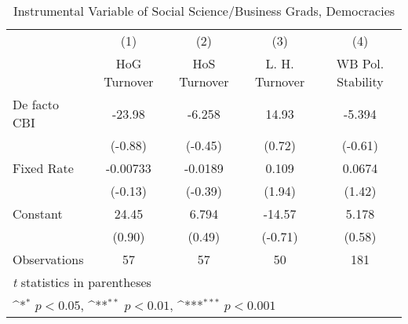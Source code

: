 \begin{table}[htbp]\centering
\def\sym#1{\ifmmode^{#1}\else\(^{#1}\)\fi}
\caption{Instrumental Variable of Social Science/Business Grads, Democracies \label{demIfivs4}}
\begin{tabular}{l*{4}{c}}
\toprule
                                        &\multicolumn{1}{c}{(1)}&\multicolumn{1}{c}{(2)}&\multicolumn{1}{c}{(3)}&\multicolumn{1}{c}{(4)}\\
                                        &\multicolumn{1}{c}{HoG Turnover}&\multicolumn{1}{c}{HoS Turnover}&\multicolumn{1}{c}{L. H. Turnover}&\multicolumn{1}{c}{WB Pol. Stability}\\
\midrule
De facto CBI                            &   -23.98         &   -6.258         &    14.93         &   -5.394         \\
                                        &  (-0.88)         &  (-0.45)         &   (0.72)         &  (-0.61)         \\
\addlinespace
Fixed Rate                              & -0.00733         &  -0.0189         &    0.109         &   0.0674         \\
                                        &  (-0.13)         &  (-0.39)         &   (1.94)         &   (1.42)         \\
\addlinespace
Constant                                &    24.45         &    6.794         &   -14.57         &    5.178         \\
                                        &   (0.90)         &   (0.49)         &  (-0.71)         &   (0.58)         \\
\midrule
Observations                            &       57         &       57         &       50         &      181         \\
\bottomrule
\multicolumn{5}{l}{\footnotesize \textit{t} statistics in parentheses}\\
\multicolumn{5}{l}{\footnotesize \sym{*} \(p<0.05\), \sym{**} \(p<0.01\), \sym{***} \(p<0.001\)}\\
\end{tabular}
\end{table}
